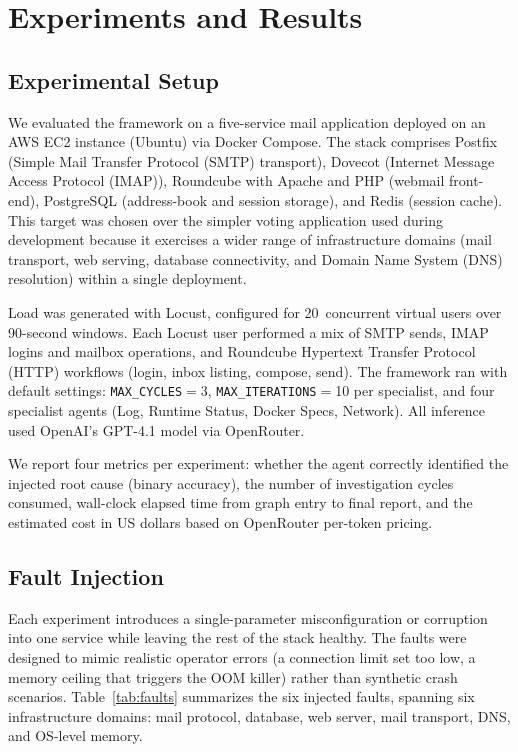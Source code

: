 \documentclass[conference]{IEEEtran}
\begin{document}
\section{Experiments and Results}

\subsection{Experimental Setup}

We evaluated the framework on a five-service mail application
deployed on an AWS EC2 instance (Ubuntu) via Docker Compose. The
stack comprises Postfix (Simple Mail Transfer Protocol (SMTP) transport),
Dovecot (Internet Message Access Protocol (IMAP)), Roundcube
with Apache and PHP (webmail front-end), PostgreSQL (address-book
and session storage), and Redis (session cache). This target was chosen over the simpler voting
application used during development because it exercises a wider
range of infrastructure domains (mail transport, web serving,
database connectivity, and Domain Name System (DNS) resolution) within a single
deployment.

Load was generated with Locust, configured for 20~concurrent virtual
users over 90-second windows. Each Locust user performed a mix of
SMTP sends, IMAP logins and mailbox operations, and Roundcube Hypertext Transfer Protocol (HTTP)
workflows (login, inbox listing, compose, send). The framework ran
with default settings: \texttt{MAX\_CYCLES}$=$3,
\texttt{MAX\_ITERATIONS}$=$10 per specialist, and four specialist
agents (Log, Runtime Status, Docker Specs, Network). All inference
used OpenAI's GPT-4.1 model via OpenRouter.

We report four metrics per experiment: whether the agent correctly
identified the injected root cause (binary accuracy), the number of
investigation cycles consumed, wall-clock elapsed time from graph
entry to final report, and the estimated cost in US dollars based on
OpenRouter per-token pricing.

\subsection{Fault Injection}

Each experiment introduces a single-parameter misconfiguration or
corruption into one service while leaving the rest of the stack
healthy. The faults were designed to mimic realistic operator
errors (a connection limit set too low, a memory ceiling that
triggers the OOM killer) rather than synthetic crash
scenarios. Table~\ref{tab:faults} summarizes the six injected
faults, spanning six infrastructure domains: mail protocol,
database, web server, mail transport, DNS, and OS-level memory.
\end{document}
